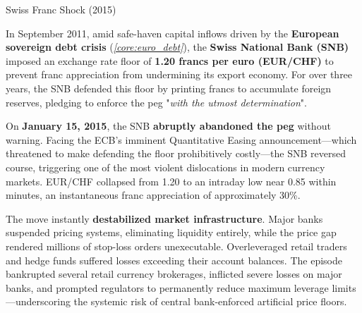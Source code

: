 \documentclass[10pt]{article}
\begin{document}
    \begin{core}[label=core:swiss_shock]{Swiss Franc Shock (2015)}

      In September 2011, amid safe-haven capital inflows driven by the \textbf{European sovereign debt crisis} (\textit{\autoref{core:euro_debt}}), the \textbf{Swiss National Bank (SNB)} imposed an exchange rate floor of \textbf{1.20 francs per euro (EUR/CHF)} to prevent franc appreciation from undermining its export economy. For over three years, the SNB defended this floor by printing francs to accumulate foreign reserves, pledging to enforce the peg "\textit{with the utmost determination}".

      On \textbf{January 15, 2015}, the SNB \textbf{abruptly abandoned the peg} without warning. Facing the ECB's imminent Quantitative Easing announcement---which threatened to make defending the floor prohibitively costly---the SNB reversed course, triggering one of the most violent dislocations in modern currency markets. EUR/CHF collapsed from 1.20 to an intraday low near 0.85 within minutes, an instantaneous franc appreciation of approximately 30\%.


      The move instantly \textbf{destabilized market infrastructure}. Major banks suspended pricing systems, eliminating liquidity entirely, while the price gap rendered millions of stop-loss orders unexecutable. Overleveraged retail traders and hedge funds suffered losses exceeding their account balances. The episode bankrupted several retail currency brokerages, inflicted severe losses on major banks, and prompted regulators to permanently reduce maximum leverage limits---underscoring the systemic risk of central bank-enforced artificial price floors.

    \end{core}
\end{document}
